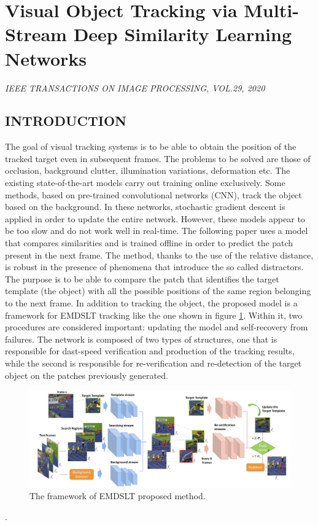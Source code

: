 \section{Visual Object Tracking via Multi-Stream Deep Similarity Learning Networks}

\begin{center}
    \author{
    Kunpeng Li,
    \emph{Student Member, IEEE},
    Yu Kong,
    \emph{Member, IEEE},
    Yunf Fu,
    \emph{Fellow, IEEE}
    }
\end{center}

\begin{center}
    \emph{IEEE TRANSACTIONS ON IMAGE PROCESSING, VOL.29, 2020}
\end{center}

\subsection{INTRODUCTION}
The goal of visual tracking systems is to be able to obtain the position of 
the tracked target even in subsequent frames. The problems to be solved are 
those of occlusion, background clutter, illumination variations, deformation 
etc. The existing state-of-the-art models carry out training online exclusively. 
Some methods, based on pre-trained convolutional networks (CNN), track 
the object based on the background. In these networks, stochastic gradient 
descent is applied in order to update the entire network. However, these 
models appear to be too slow and do not work well in real-time. The following 
paper uses a model that compares similarities and is trained offline in order to 
predict the patch present in the next frame. The method, thanks to the use of 
the relative distance, is robust in the presence of phenomena that introduce 
the so called distractors. The purpose is to be able to compare the patch that 
identifies the target template (the object) with all the possible positions 
of the same region belonging to the next frame. In addition to tracking the 
object, the proposed model is a framework for EMDSLT tracking like the 
one shown in figure \ref{fig:EMDSLT}. Within it, two procedures are considered important: 
updating the model and self-recovery from failures. The network is composed 
of two types of structures, one that is responsible for dast-speed verification 
and production of the tracking results, while the second is responsible for re-verification 
and re-detection of the target object on the patches previously 
generated.
\begin{figure}[h!]
    \centering
    \includegraphics[width = \linewidth]{images/paper8/EMDSLT.png}
    \centering
    \caption{The framework of EMDSLT proposed method.}
    \label{fig:EMDSLT}
\end{figure}.